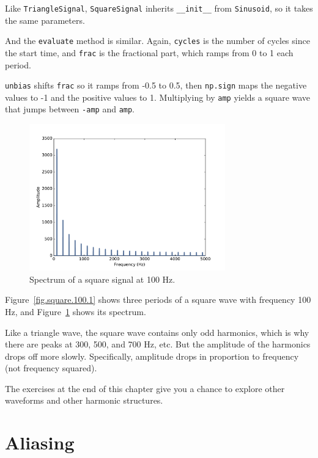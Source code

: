 \documentclass[12pt]{book}
\begin{document}
Like {\tt TriangleSignal}, {\tt SquareSignal} inherits 
\verb"__init__" from {\tt Sinusoid}, so it takes the same
parameters.

And the {\tt evaluate} method is similar.  Again, {\tt cycles} is
the number of cycles since the start time, and {\tt frac} is the
fractional part, which ramps from 0 to 1 each period.

{\tt unbias} shifts {\tt frac} so it ramps from -0.5 to 0.5,
then {\tt np.sign} maps the negative values to -1 and the
positive values to 1.  Multiplying by {\tt amp} yields a square
wave that jumps between {\tt -amp} and {\tt amp}.

\begin{figure}
\centerline{\includegraphics[height=2.5in]{figs/square-100-2.pdf}}
\caption{Spectrum of a square signal at 100 Hz.}
\label{fig.square.100.2}
\end{figure}

Figure~\ref{fig.square.100.1} shows three periods of a square
wave with frequency 100 Hz,
and Figure~\ref{fig.square.100.2} shows its spectrum.

Like a triangle wave, the square wave contains only odd harmonics,
which is why there are peaks at 300, 500, and 700 Hz, etc.
But the amplitude of the harmonics drops off more slowly.
Specifically, amplitude drops in proportion to frequency (not frequency
squared).

The exercises at the end of this chapter give you a chance to
explore other waveforms and other harmonic structures.


\section{Aliasing}
\label{aliasing}
\end{document}
